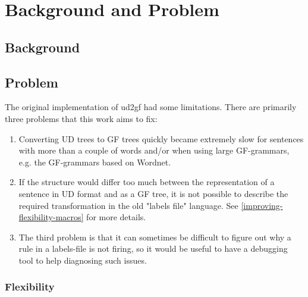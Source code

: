 \chapter{Background and Problem}



\section{Background}
\section{Problem}



The original implementation of ud2gf had some limitations. There are primarily three problems that this work aims to fix:

\begin{enumerate}
    \item Converting UD trees to GF trees quickly became extremely slow for sentences with more than a couple of words and/or
    when using large GF-grammars, e.g. the GF-grammars based on Wordnet\cite{angelov2016predicting}.
\item
    If the structure would differ too much between the representation of a sentence in UD format and as a GF tree, it is not possible to describe the required transformation in the old "labels file" language. See \autoref{improving-flexibility-macros} for more details.
\item
    The third problem is that it can sometimes be difficult to figure out why a rule in a labels-file is not firing, so it would be useful to have a debugging tool to help diagnosing such issues.
\end{enumerate}

\subsection{Flexibility}\label{sect:flex}

